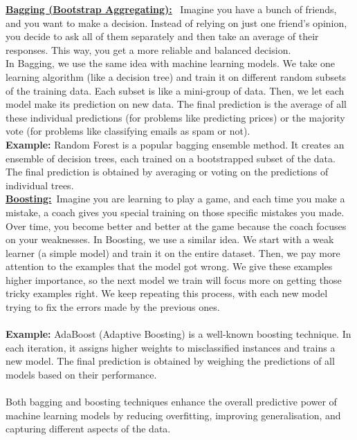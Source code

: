 \documentclass[12pt]{article}
\begin{document}
\textbf{\underline{Bagging (Bootstrap Aggregating):}} \
  Imagine you have a bunch of friends, and you want to make a decision. Instead of relying on just one friend's opinion, you decide to ask all of them separately and then take an average of their responses. This way, you get a more reliable and balanced decision.\\
In Bagging, we use the same idea with machine learning models. We take one learning algorithm (like a decision tree) and train it on different random subsets of the training data. Each subset is like a mini-group of data. Then, we let each model make its prediction on new data. The final prediction is the average of all these individual predictions (for problems like predicting prices) or the majority vote (for problems like classifying emails as spam or not).
\\
\textbf{Example:} Random Forest is a popular bagging ensemble method. It creates an ensemble of decision trees, each trained on a bootstrapped subset of the data. The final prediction is obtained by averaging or voting on the predictions of individual trees.
\\

\textbf{\underline{Boosting:}}\
Imagine you are learning to play a game, and each time you make a mistake, a coach gives you special training on those specific mistakes you made. Over time, you become better and better at the game because the coach focuses on your weaknesses.
In Boosting, we use a similar idea. We start with a weak learner (a simple model) and train it on the entire dataset. Then, we pay more attention to the examples that the model got wrong. We give these examples higher importance, so the next model we train will focus more on getting those tricky examples right. We keep repeating this process, with each new model trying to fix the errors made by the previous ones.
\\\\
\textbf{Example:} AdaBoost (Adaptive Boosting) is a well-known boosting technique. In each iteration, it assigns higher weights to misclassified instances and trains a new model. The final prediction is obtained by weighing the predictions of all models based on their performance.
\\\\


Both bagging and boosting techniques enhance the overall predictive power of machine learning models by reducing overfitting, improving generalisation, and capturing different aspects of the data.
\end{document}
